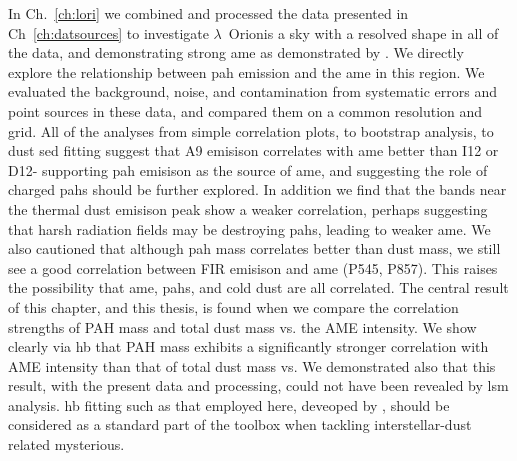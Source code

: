   In Ch.~\ref{ch:lori} we combined and processed the data presented in Ch~\ref{ch:datsources} to investigate $\lambda$~Orionis a sky with a resolved shape in all of the data, and demonstrating strong \gls{ame} as demonstrated by \cite{planck15}. We directly explore the relationship between \gls{pah} emission and the \gls{ame} in this region.  We evaluated the background, noise, and contamination from systematic errors and point sources in these data, and compared them on a common resolution and grid. All of the analyses from simple correlation plots, to bootstrap analysis, to dust \gls{sed} fitting suggest that A9 emisison correlates with \gls{ame} better than I12 or D12- supporting \gls{pah} emisison as the source of \gls{ame}, and suggesting the role of charged \gls{pah}s should be further explored. In addition we find that the bands near the thermal dust emisison peak show a weaker correlation, perhaps suggesting that harsh radiation fields may be destroying \gls{pah}s, leading to weaker \gls{ame}. We also cautioned that although \gls{pah} mass correlates better than dust mass, we still see a good correlation between FIR emisison and \gls{ame} (P545, P857). This raises the possibility that \gls{ame}, \gls{pah}s, and cold dust are all correlated. The central result of this chapter, and this thesis, is found when we compare the correlation strengths of PAH mass and total dust mass vs. the AME intensity. We show clearly via \gls{hb} that PAH mass exhibits a significantly stronger correlation with AME intensity than that of total dust mass vs. We demonstrated also that this result, with the present data and processing, could not have been revealed by \gls{lsm} analysis. \gls{hb} fitting such as that employed here, deveoped by \cite{galliano18}, should be considered as a standard part of the toolbox when tackling interstellar-dust related mysterious.


